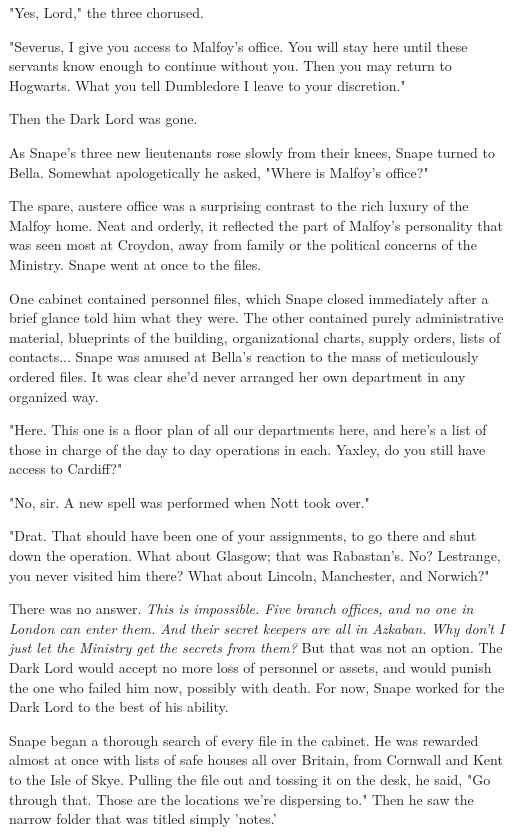 \documentclass[a4paper,11pt]{article}
\begin{document}
"Yes, Lord," the three chorused.

"Severus, I give you access to Malfoy's office. You will stay here until these servants know enough to continue without you. Then you may return to Hogwarts. What you tell Dumbledore I leave to your discretion."

Then the Dark Lord was gone.

As Snape's three new lieutenants rose slowly from their knees, Snape turned to Bella. Somewhat apologetically he asked, "Where is Malfoy's office?"

The spare, austere office was a surprising contrast to the rich luxury of the Malfoy home. Neat and orderly, it reflected the part of Malfoy's personality that was seen most at Croydon, away from family or the political concerns of the Ministry. Snape went at once to the files.

One cabinet contained personnel files, which Snape closed immediately after a brief glance told him what they were. The other contained purely administrative material, blueprints of the building, organizational charts, supply orders, lists of contacts... Snape was amused at Bella's reaction to the mass of meticulously ordered files. It was clear she'd never arranged her own department in any organized way.

"Here. This one is a floor plan of all our departments here, and here's a list of those in charge of the day to day operations in each. Yaxley, do you still have access to Cardiff?"

"No, sir. A new spell was performed when Nott took over."

"Drat. That should have been one of your assignments, to go there and shut down the operation. What about Glasgow; that was Rabastan's. No? Lestrange, you never visited him there? What about Lincoln, Manchester, and Norwich?"

There was no answer. \emph{This is impossible. Five branch offices, and no one in London can enter them. And their secret keepers are all in Azkaban. Why don't I just let the Ministry get the secrets from them?} But that was not an option. The Dark Lord would accept no more loss of personnel or assets, and would punish the one who failed him now, possibly with death. For now, Snape worked for the Dark Lord to the best of his ability.

Snape began a thorough search of every file in the cabinet. He was rewarded almost at once with lists of safe houses all over Britain, from Cornwall and Kent to the Isle of Skye. Pulling the file out and tossing it on the desk, he said, "Go through that. Those are the locations we're dispersing to." Then he saw the narrow folder that was titled simply 'notes.'
\end{document}
